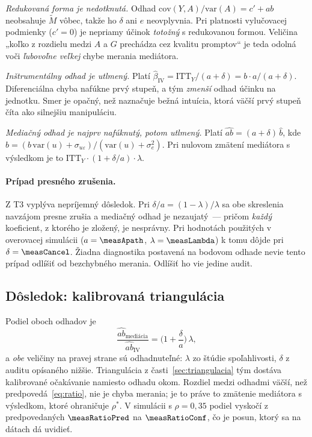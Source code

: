 \begin{description}[leftmargin=1.0cm, nosep]
    \item[\textbf{T1.}] \emph{Redukovaná forma je nedotknutá.} Odhad $\mathrm{cov}(Y,A)/\mathrm{var}(A) = c' + ab$ neobsahuje $\widetilde{M}$ vôbec, takže ho $\delta$ ani $e$ neovplyvnia. Pri platnosti vylučovacej podmienky ($c'=0$) je nepriamy účinok \emph{totožný} s redukovanou formou. Veličina „koľko z rozdielu medzi $A$ a $G$ prechádza cez kvalitu promptov“ je teda odolná voči \emph{ľubovoľne veľkej} chybe merania mediátora.
    \item[\textbf{T2.}] \emph{Inštrumentálny odhad je utlmený.} Platí $\hat\beta_{\mathrm{IV}} = \mathrm{ITT}_Y/(a+\delta) = b\cdot a/(a+\delta)$. Diferenciálna chyba nafúkne prvý stupeň, a tým \emph{zmenší} odhad účinku na jednotku. Smer je opačný, než naznačuje bežná intuícia, ktorá väčší prvý stupeň číta ako silnejšiu manipuláciu.
    \item[\textbf{T3.}] \emph{Mediačný odhad je najprv nafúknutý, potom utlmený.} Platí $\widehat{ab} = (a+\delta)\,\hat b$, kde $\hat b = (b\,\mathrm{var}(u) + \sigma_{u\varepsilon})/(\mathrm{var}(u)+\sigma_e^2)$. Pri nulovom zmätení mediátora s výsledkom je to $\mathrm{ITT}_Y\cdot(1+\delta/a)\cdot\lambda$.
\end{description}

\paragraph{Prípad presného zrušenia.} Z T3 vyplýva nepríjemný dôsledok. Pri $\delta/a = (1-\lambda)/\lambda$ sa obe skreslenia navzájom presne zrušia a mediačný odhad je nezaujatý~--- pričom \emph{každý} koeficient, z ktorého je zložený, je nesprávny. Pri hodnotách použitých v overovacej simulácii ($a=\measApath$, $\lambda=\measLambda$) k tomu dôjde pri $\delta = \measCancel$. Žiadna diagnostika postavená na bodovom odhade nevie tento prípad odlíšiť od bezchybného merania. Odlíšiť ho vie jedine audit.

\subsection{Dôsledok: kalibrovaná triangulácia}

Podiel oboch odhadov je
\begin{equation}
    \frac{\widehat{ab}_{\text{mediácia}}}{\widehat{ab}_{\mathrm{IV}}} = \Big(1+\frac{\delta}{a}\Big)\,\lambda ,
    \label{eq:ratio}
\end{equation}
a \emph{obe} veličiny na pravej strane sú odhadnuteľné: $\lambda$ zo štúdie spoľahlivosti, $\delta$ z auditu opísaného nižšie. Triangulácia z časti~\ref{sec:triangulacia} tým dostáva kalibrované očakávanie namiesto odhadu okom. Rozdiel medzi odhadmi väčší, než predpovedá~\eqref{eq:ratio}, nie je chyba merania; je to práve to zmätenie mediátora s výsledkom, ktoré ohraničuje $\rho^\ast$. V simulácii s $\rho=0{,}35$ podiel vyskočí z predpovedaných $\measRatioPred$ na $\measRatioConf$, čo je posun, ktorý sa na dátach dá uvidieť.

